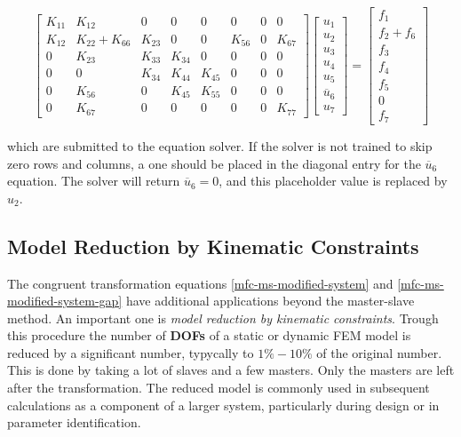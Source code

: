 \documentclass[10pt,b5paper,titlepage]{book}
\begin{document}
\begin{equation}
    \begin{bmatrix}
        K_{11} & K_{12} & 0 & 0 & 0 & 0 & 0 & 0 \\
        K_{12} & K_{22} + K_{66} & K_{23} & 0 & 0 & K_{56} & 0 & K_{67} \\
        0 & K_{23} & K_{33} & K_{34} & 0 & 0 & 0 & 0 \\
        0 & 0 & K_{34} & K_{44} & K_{45} & 0 & 0 & 0 \\
        0 & K_{56} & 0 & K_{45} & K_{55} & 0 & 0 & 0 \\
        0 & K_{67} & 0 & 0 & 0 & 0 & 0 & K_{77}
    \end{bmatrix}
    \begin{bmatrix}
        u_1 \\
        u_2 \\
        u_3 \\
        u_4 \\
        u_5 \\
        \overline{u}_6 \\
        u_7
    \end{bmatrix}
    = \begin{bmatrix}
        f_1 \\
        f_2 + f_6 \\
        f_3 \\
        f_4 \\
        f_5 \\
        0 \\
        f_7
    \end{bmatrix}
\end{equation}

which are submitted to the equation solver. If the solver is not trained to skip
zero rows and columns, a one should be placed in the diagonal entry for the
$ \overline{u}_6 $ equation. The solver will return $ \overline{u}_6 = 0 $,
and this placeholder value is replaced by $ u_2 $.


\subsection{Model Reduction by Kinematic Constraints}

The congruent transformation equations \eqref{mfc-ms-modified-system}
and \eqref{mfc-ms-modified-system-gap} have additional applications beyond the
master-slave method. An important one is \textit{model reduction by kinematic constraints}.
Trough this procedure the number of \textbf{DOFs} of a static or dynamic FEM model
is reduced by a significant number, typycally to $ 1 \% - 10 \% $ of the original number.
This is done by taking a lot of slaves and a few masters. Only the masters are left
after the transformation. The reduced model is commonly used in subsequent calculations
as a component of a larger system, particularly during design or in parameter
identification.
\end{document}
